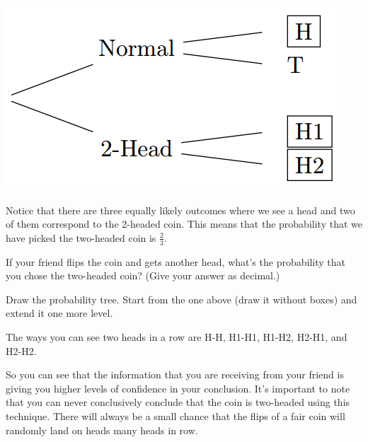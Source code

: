 \documentclass{ximera}
\begin{document}
\begin{image}
\includegraphics{2headedcoin1.png}
\end{image}

Notice that there are three equally likely outcomes where we see a head and two of them correspond to the 2-headed coin. This means that the probability that we have picked the two-headed coin is $\frac{2}{3}$.

\begin{question}
If your friend flips the coin and gets another head, what's the probability that you chose the two-headed coin? (Give your answer as decimal.)

    \begin{hint}
      Draw the probability tree. Start from the one above (draw it without boxes) and extend it one more level.
    \end{hint}
    \begin{hint}
      The ways you can see two heads in a row are H-H, H1-H1, H1-H2, H2-H1, and H2-H2.
    \end{hint}

\end{question}

So you can see that the information that you are receiving from your friend is giving you higher levels of confidence in your conclusion. It's important to note that you can never conclusively conclude that the coin is two-headed using this technique. There will always be a small chance that the flips of a fair coin will randomly land on heads many heads in row.
\end{document}
